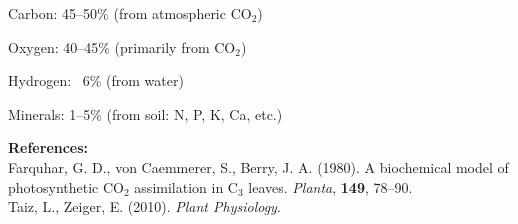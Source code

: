 \begin{technical}
\noindent Carbon: 45–50\% (from atmospheric $\mathrm{CO}_2$)

\noindent Oxygen: 40–45\% (primarily from $\mathrm{CO}_2$)

\noindent Hydrogen: ~6\% (from water)

\noindent Minerals: 1–5\% (from soil: N, P, K, Ca, etc.)

\vspace{0.5em}
\noindent\textbf{References:}\\
{\footnotesize
Farquhar, G. D., von Caemmerer, S., Berry, J. A. (1980). A biochemical model of photosynthetic $\mathrm{CO}_2$ assimilation in C$_3$ leaves. \textit{Planta}, \textbf{149}, 78–90.\\
Taiz, L., Zeiger, E. (2010). \textit{Plant Physiology}.
}
\end{technical}
